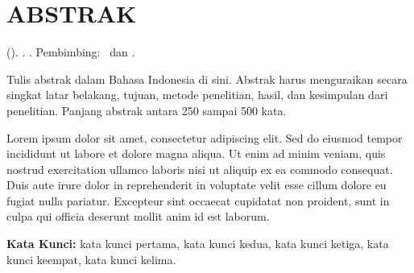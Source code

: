 
\chapter*{ABSTRAK}
\thispagestyle{plain}

\begin{abstrakenv}

\noindent
\textbf{\NamaMahasiswa} (\NIM). \textbf{\NamaProdi}.
\textit{\JudulTA}. Pembimbing: \NamaPembimbing\ dan \NamaPembimbingDua.

\vspace{0.5cm}

Tulis abstrak dalam Bahasa Indonesia di sini. Abstrak harus menguraikan secara singkat
latar belakang, tujuan, metode penelitian, hasil, dan kesimpulan dari penelitian.
Panjang abstrak antara 250 sampai 500 kata.

Lorem ipsum dolor sit amet, consectetur adipiscing elit. Sed do eiusmod tempor incididunt
ut labore et dolore magna aliqua. Ut enim ad minim veniam, quis nostrud exercitation
ullamco laboris nisi ut aliquip ex ea commodo consequat. Duis aute irure dolor in
reprehenderit in voluptate velit esse cillum dolore eu fugiat nulla pariatur.
Excepteur sint occaecat cupidatat non proident, sunt in culpa qui officia deserunt
mollit anim id est laborum.

\vspace{0.5cm}

\noindent
\textbf{Kata Kunci:} kata kunci pertama, kata kunci kedua, kata kunci ketiga, kata kunci keempat, kata kunci kelima.

\end{abstrakenv}
